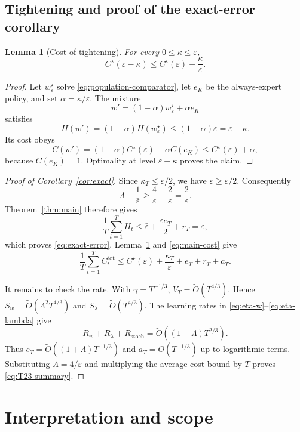 \documentclass[11pt]{article}
\newtheorem{lemma}{Lemma}
\newcommand{\eps}{\varepsilon}
\begin{document}
\subsection{Tightening and proof of the exact-error corollary}

\begin{lemma}[Cost of tightening]
\label{lem:tightening}
For every $0\le\kappa\le\eps$,
\begin{equation}
  C^\star(\eps-\kappa)
  \le C^\star(\eps)+\frac{\kappa}{\eps}.
  \label{eq:value-lipschitz}
\end{equation}
\end{lemma}

\begin{proof}
Let $w^\star_\eps$ solve \eqref{eq:population-comparator}, let $e_K$ be the
always-expert policy, and set $\alpha=\kappa/\eps$.  The mixture
\[
  w'=(1-\alpha)w^\star_\eps+\alpha e_K
\]
satisfies
\[
  H(w')=(1-\alpha)H(w^\star_\eps)
  \le(1-\alpha)\eps=\eps-\kappa.
\]
Its cost obeys
\[
  C(w')
  =(1-\alpha)C^\star(\eps)+\alpha C(e_K)
  \le C^\star(\eps)+\alpha,
\]
because $C(e_K)=1$.  Optimality at level $\eps-\kappa$ proves the claim.
\end{proof}

\begin{proof}[Proof of Corollary~\ref{cor:exact}]
Since $\kappa_T\le\eps/2$, we have
$\bar\eps\ge\eps/2$.  Consequently
\[
  \Lambda-\frac1{\bar\eps}
  \ge\frac4\eps-\frac2\eps
  =\frac2\eps.
\]
Theorem~\ref{thm:main} therefore gives
\[
  \frac1T\sum_{t=1}^T H_t
  \le
  \bar\eps+\frac{\eps e_T}{2}+r_T
  =\eps,
\]
which proves \eqref{eq:exact-error}.  Lemma~\ref{lem:tightening} and
\eqref{eq:main-cost} give
\[
  \frac1T\sum_{t=1}^T C_t^{\mathrm{tot}}
  \le
  C^\star(\eps)+\frac{\kappa_T}{\eps}
  +e_T+r_T+a_T.
\]

It remains to check the rate.  With $\gamma=T^{-1/3}$,
$V_T=\widetilde O(T^{4/3})$.  Hence
$S_w=\widetilde O(\Lambda^2T^{4/3})$ and
$S_\lambda=\widetilde O(T^{4/3})$.  The learning rates in
\eqref{eq:eta-w}--\eqref{eq:eta-lambda} give
\[
  R_w+R_\lambda+R_{\mathrm{stoch}}
  =\widetilde O((1+\Lambda)T^{2/3}).
\]
Thus $e_T=\widetilde O((1+\Lambda)T^{-1/3})$ and
$a_T=O(T^{-1/3})$ up to logarithmic terms.  Substituting
$\Lambda=4/\eps$ and multiplying the average-cost bound by $T$ proves
\eqref{eq:T23-summary}.
\end{proof}

\section{Interpretation and scope}
\label{sec:scope}
\end{document}
